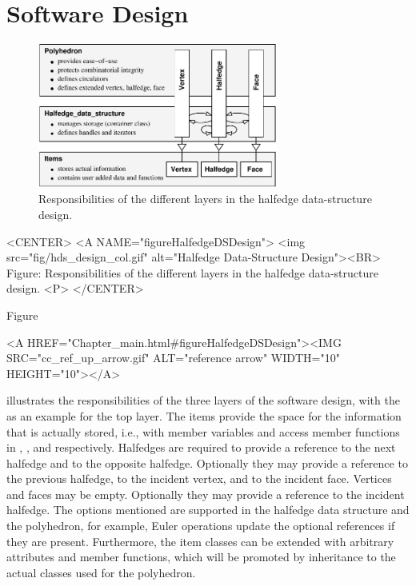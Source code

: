 \section{Software Design}


\begin{ccTexOnly}
  \begin{figure}
    \begin{center}
      \parbox{0.7\textwidth}{%
          \includegraphics[width=0.7\textwidth]{HalfedgeDS/fig/hds_design}%
      }
    \end{center}
    \caption{Responsibilities of the different layers in the 
             halfedge data-structure design.}
    \label{figureHalfedgeDSDesign}
  \end{figure}
\end{ccTexOnly}

\begin{ccHtmlOnly}
    <CENTER>
    <A NAME="figureHalfedgeDSDesign">
        <img src="fig/hds_design_col.gif"
         alt="Halfedge Data-Structure Design"><BR>
    Figure: Responsibilities of the different layers in the 
            halfedge data-structure design.
    <P>
    </CENTER>
\end{ccHtmlOnly}

Figure~\ccTexHtml{\ref{figureHalfedgeDSDesign}}{}\begin{ccHtmlOnly}
  <A HREF="Chapter_main.html#figureHalfedgeDSDesign"><IMG 
  SRC="cc_ref_up_arrow.gif" ALT="reference arrow" WIDTH="10" HEIGHT="10"></A>
\end{ccHtmlOnly}
illustrates the responsibilities of the three layers of the software
design, with the  as an example for the top
layer.  The items provide the space for the information that is
actually stored, i.e., with member variables and access member
functions in , , and 
respectively. Halfedges are required to provide a reference to the
next halfedge and to the opposite halfedge.  Optionally they may
provide a reference to the previous halfedge, to the incident vertex,
and to the incident face. Vertices and faces may be empty. Optionally
they may provide a reference to the incident halfedge. The options
mentioned are supported in the halfedge data structure and the
polyhedron, for example, Euler operations update the optional
references if they are present. Furthermore, the item classes can be
extended with arbitrary attributes and member functions, which will be
promoted by inheritance to the actual classes used for the polyhedron.

